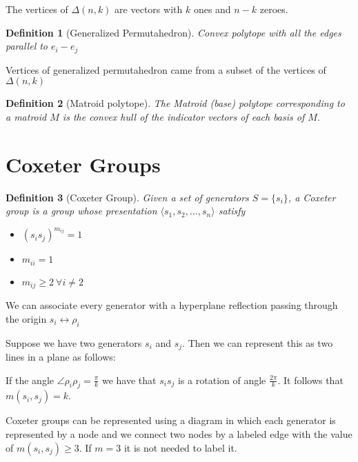 \documentclass{myclass}
\newtheorem*{definition}{Definition}
\begin{document}
The vertices of $\Delta(n,k)$ are vectors with $k$ ones and  $n-k$ zeroes.

\begin{definition}[Generalized Permutahedron] Convex polytope with all the edges parallel to $e_i-e_j$
\end{definition}

Vertices of generalized permutahedron came from a subset of the vertices of $\Delta(n, k)$

 \begin{definition}[Matroid polytope] 
   The Matroid (base) polytope corresponding to a matroid $M$ is the convex hull of the indicator vectors of each basis of  $M$.
\end{definition}


\section{Coxeter Groups}
\begin{definition}[Coxeter Group]
    Given a set of generators $S = \{s_i\}$, a Coxeter group is a group whose presentation $\langle s_1, s_2, \ldots, s_n  \rangle $ satisfy
\begin{itemize}[topsep=-6pt, itemsep=0pt]
  \item $(s_is_j)^{m_{ij}} = 1$
  \item $m_{ii} = 1$
  \item $m_{ij}\ge 2 \ \forall i\neq 2$
\end{itemize}
\end{definition}

We can associate every generator with a hyperplane reflection passing through the origin $s_i \leftrightarrow \rho_i$

Suppose we have two generators $s_i$ and  $s_j$. Then we can represent this as two lines in a plane as follows:

If the angle $\angle \rho_i \rho _j = \frac{\pi}{k}$ we have that $s_is_j$ is a rotation of angle $\frac{2\pi}{k}$. It follows that $m(s_i, s_j)=k$.

Coxeter groups can be represented using a diagram in which each generator is represented by a node and we connect two nodes by a labeled edge with the value of $m(s_i, s_j)\ge 3$. If $m=3$ it is not needed to label it. 

\begin{center}
\end{center}
\end{document}
